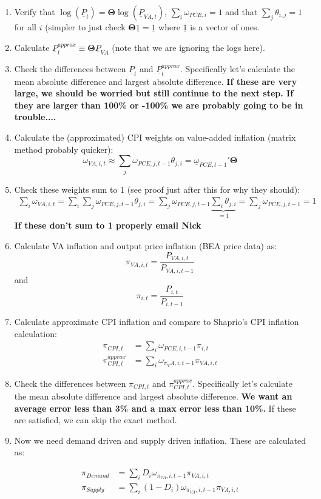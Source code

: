 \documentclass[12pt,english]{article}
\begin{document}
\begin{enumerate}
	\item Verify that $\log(\underline{P}_t) = \mathbold{\Theta} \log(\underline{P}_{VA,t})$, $\sum_i \omega_{PCE,i}=1$ and that $\sum_j \theta_{i,j}=1$ for all $i$ (simpler to just check $\mathbold{\Theta}\underline{1} = \underline{1}$ where $\underline{1}$ is a vector of ones.
	\item Calculate $\underline{P}_{t}^{approx} \equiv \mathbold{\Theta} \underline{P}_{VA}$ (note that we are ignoring the logs here).
	\item Check the differences between $\underline{P}_t$ and $\underline{P}_{t}^{approx}$. Specifically let's calculate the mean absolute difference and largest absolute difference. {\bf If these are very large, we should be worried but still continue to the next step. If they are larger than 100\% or -100\% we are probably going to be in trouble....} 
	\item Calculate the (approximated) CPI weights on value-added inflation (matrix method probably quicker): 
	\[
		\omega_{VA,i,t}\approx \sum_j \omega_{PCE,j,t-1} \theta_{j,i} = \underline{\omega}_{PCE,t-1}'\mathbold{\Theta}
	\]
	\item Check these weights sum to 1 (see proof just after this for why they should):
	\begin{align*}
		\sum_i\omega_{VA,i,t} = \sum_i\sum_j \omega_{PCE,j,t-1} \theta_{j,i} = \sum_j \omega_{PCE,j,t-1} \underbrace{\sum_i \theta_{j,i}}_{=1} = \sum_j \omega_{PCE,j,t-1}=1
	\end{align*}
	{\bf If these don't sum to 1 properly email Nick}	
	\item Calculate VA inflation and output price inflation (BEA price data) as:
	\[
		\pi_{VA,i,t} = \frac{P_{VA,i,t}}{P_{VA,i,t-1}}	
	\]
	and 
	\[
		\pi_{i,t} = \frac{P_{i,t}}{P_{i,t-1}}	
	\]	
	\item Calculate approximate CPI inflation and compare to Shaprio's CPI inflation calculation:
	\begin{align*}
		\pi_{CPI,t} &=  \sum_i \omega_{PCE,i,t-1} \pi_{i,t}\\
		\pi_{CPI,t}^{approx} &= \sum_i \omega_{\pi_VA,i,t-1}\pi_{VA,i,t}
	\end{align*}
		
	\item Check the differences between $\pi_{CPI,t}$ and $\pi_{CPI,t}^{approx}$. Specifically let's calculate the mean absolute difference and largest absolute difference. {\bf We want an average error less than 3\% and a max error less than 10\%. }
	If these are satisfied, we can skip the exact method.
	\item Now we need demand driven and supply driven inflation. These are calculated as:
	
	\begin{align*}
		\pi_{Demand} &= \sum_i D_i \omega_{\pi_{VA},i,t-1} \pi_{VA,i,t}\\
		\pi_{Supply} &= \sum_i (1-D_i) \omega_{\pi_{VA},i,t-1} \pi_{VA,i,t}\\
	\end{align*}
\end{enumerate}
\end{document}
